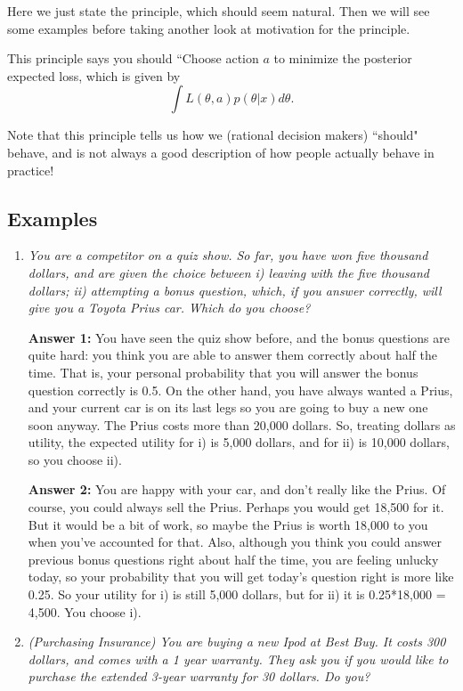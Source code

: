 \documentclass[12pt]{article}
\begin{document}
Here we just state the principle, which should seem natural.
Then we will see some examples before taking another look
at motivation for the principle.

This principle says you should ``Choose action $a$ to minimize the posterior expected loss, which is given by
$$\int L(\theta, a) p(\theta | x) d\theta.$$

Note that this principle tells us how we (rational decision makers)
``should" behave, and is
not always a good description of how people actually behave
in practice!

\subsection{Examples}

\bigskip
\begin{enumerate}

\item {\it You are a competitor on a quiz show. So far, you have won five thousand dollars, and are given the choice between i) leaving with the five thousand dollars; ii) attempting a bonus question, which, if you answer correctly, will give you a Toyota Prius car. Which do you choose?}

{\bf Answer 1:} You have seen the quiz show before, and the bonus questions are quite hard: you think
you are able to answer them correctly about half the time. That is, your personal probability that
you will answer the bonus question correctly is 0.5. On the other hand, you have always wanted
a Prius, and your current car is on its last legs so you are going to buy a new one soon
anyway. The Prius costs more than 20,000 dollars. So, treating dollars as utility, the expected utility
for i) is 5,000 dollars, and for ii) is 10,000 dollars, so you choose ii).

{\bf Answer 2:} You are happy with your car, and don't really like the Prius. Of course, you could always
sell the Prius. Perhaps you would get 18,500 for it. But it would be a bit of work, so maybe
the Prius is worth 18,000 to you when you've accounted for that. Also,
although you think you could answer previous bonus questions right about half the time, you
are feeling unlucky today, so your probability that you will get today's question right is more like 0.25.
So your utility for i) is still 5,000 dollars, but for ii) it is 0.25*18,000 = 4,500. You choose i).

\medskip

\item {\it (Purchasing Insurance) You are buying a new Ipod at Best Buy. It costs 300 dollars,
and comes with a 1 year warranty.
They ask you if you would like to purchase the extended 3-year warranty for 30 dollars. Do you?}


\end{enumerate}
\end{document}

